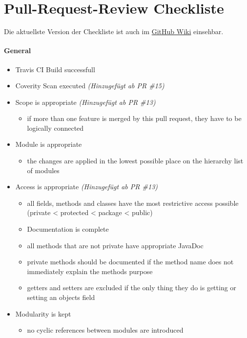 \documentclass[accentcolor=tud0b,12pt,paper=a4]{tudreport}
\begin{document}
\section{Pull-Request-Review Checkliste}
Die aktuellste Version der Checkliste ist auch im \href{https://github.com/TUDa-BP-11/opendiabetes-uam-heuristik/wiki/Checklist-Pull-Request-Review}{GitHub Wiki} einsehbar.

\paragraph{General}
\begin{itemize}
\item Travis CI Build successfull
\item Coverity Scan executed \textit{(Hinzugefügt ab PR \#15)}
\item Scope is appropriate \textit{(Hinzugefügt ab PR \#13)}
	\begin{itemize}
	\item if more than one feature is merged by this pull request, they have to be logically connected
	\end{itemize}
\item Module is appropriate
	\begin{itemize}
	\item the changes are applied in the lowest possible place on the hierarchy list of modules
	\end{itemize}
\item Access is appropriate \textit{(Hinzugefügt ab PR \#13)}
	\begin{itemize}
	\item all fields, methods and classes have the most restrictive access possible (private < protected < package < public)
\item Documentation is complete
	\end{itemize}
	\begin{itemize}
	\item all methods that are not private have appropriate JavaDoc
	\item private methods should be documented if the method name does not immediately explain the methods purpose
	\item getters and setters are excluded if the only thing they do is getting or setting an objects field
	\end{itemize}
\item Modularity is kept
	\begin{itemize}
	\item no cyclic references between modules are introduced

\end{itemize}
\end{itemize}
\end{document}
